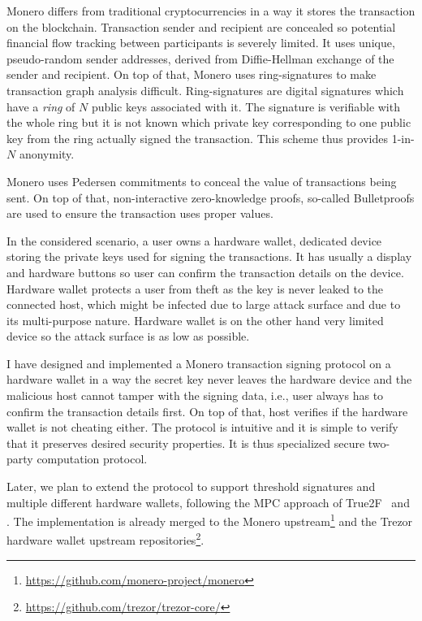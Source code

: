 \documentclass[
  digital, %
  twoside, %
  table,   %
  lof,     %
  lot,     %
]{fithesis3}
\newcounter{ph4_show_guides}
\theoremstyle{definition}
\theoremstyle{remark}
\begin{document}
Monero differs from traditional cryptocurrencies in a way it stores the transaction on the blockchain. Transaction sender and recipient are concealed so potential financial flow tracking between participants is severely limited. It uses unique, pseudo-random sender addresses, derived from Diffie-Hellman exchange of the sender and recipient. On top of that, Monero uses ring-signatures to make transaction graph analysis difficult. Ring-signatures are digital signatures which have a \emph{ring} of $N$ public keys associated with it. The signature is verifiable with the whole ring but it is not known which private key corresponding to one public key from the ring actually signed the transaction. This scheme thus provides 1-in-$N$ anonymity.

Monero uses Pedersen commitments to conceal the value of transactions being sent. On top of that, non-interactive zero-knowledge proofs, so-called Bulletproofs \cite{Bnz2017BulletproofsSP2} are used to ensure the transaction uses proper values.

In the considered scenario, a user owns a hardware wallet, dedicated device storing the private keys used for signing the transactions. It has usually a display and hardware buttons so user can confirm the transaction details on the device. Hardware wallet protects a user from theft as the key is never leaked to the connected host, which might be infected due to large attack surface and due to its multi-purpose nature. Hardware wallet is on the other hand very limited device so the attack surface is as low as possible. 

I have designed and implemented a Monero transaction signing protocol on a hardware wallet in a way the secret key never leaves the hardware device and the malicious host cannot tamper with the signing data, i.e., user always has to confirm the transaction details first. On top of that, host verifies if the hardware wallet is not cheating either. The protocol is intuitive and it is simple to verify that it preserves desired security properties. It is thus specialized secure two-party computation protocol. 

Later, we plan to extend the protocol to support threshold signatures and multiple different hardware wallets, following the MPC approach of True2F~\cite{DCMBR18} and 
\cite{2017-ccs-mavroudis}. The implementation is already merged to the Monero upstream\footnote{\url{https://github.com/monero-project/monero}} and the Trezor hardware wallet upstream repositories\footnote{\url{https://github.com/trezor/trezor-core/}}.
\end{document}
